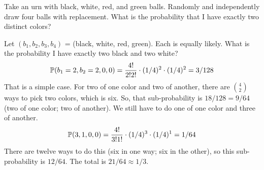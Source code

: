 \begin{example}
    Take an urn with black, white, red, and green balls. Randomly and independently draw four balls with replacement. What is the probability that I have exactly two distinct colors?
\end{example}
\begin{solution}
    Let $(b_1, b_2, b_3, b_4)$ = (black, white, red, green). Each is equally likely. What is the probability I have exactly two black and two white?
    \begin{align}
        \mathbb{P}(b_1=2, b_2=2, 0, 0) = \dfrac{4!}{2!2!} \cdot (1/4)^2 \cdot (1/4)^2 = 3/128
    \end{align}
    That is a simple case. For two of one color and two of another, there are $\binom{4}{2}$ ways to pick two colors, which is six. So, that sub-probability is $18/128 = 9/64$ (two of one color; two of another). We still have to do one of one color and three of another.
    \begin{align}
        \mathbb{P}(3, 1, 0, 0) = \dfrac{4!}{3!1!} \cdot (1/4)^3 \cdot (1/4)^1 = 1/64
    \end{align}
    There are twelve ways to do this (six in one way; six in the other), so this sub-probability is $12/64$. The total is $21/64 \approx 1/3$.
\end{solution}

